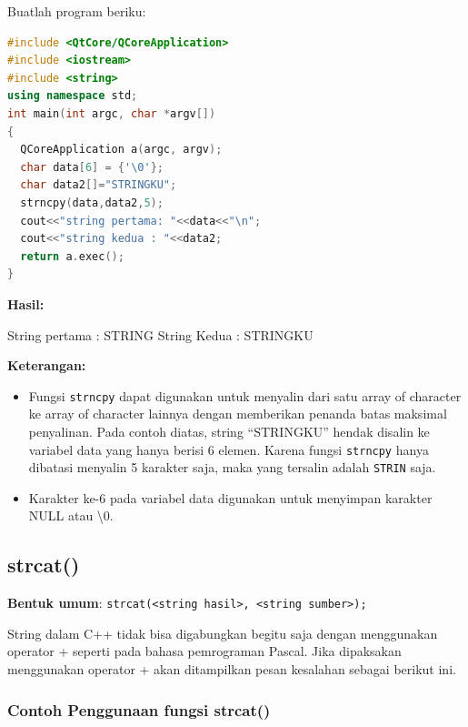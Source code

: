 Buatlah program beriku:

\begin{lstlisting}[language=c++, caption=Penggunaan fungsi strncpy(), label=contoh3-22]
#include <QtCore/QCoreApplication>
#include <iostream>
#include <string>
using namespace std;
int main(int argc, char *argv[])
{
  QCoreApplication a(argc, argv);
  char data[6] = {'\0'};
  char data2[]="STRINGKU";
  strncpy(data,data2,5);
  cout<<"string pertama: "<<data<<"\n";
  cout<<"string kedua : "<<data2;
  return a.exec();
}
\end{lstlisting}

\textbf{Hasil:}
\begin{lcverbatim}
 String pertama : STRING
 String Kedua : STRINGKU
\end{lcverbatim}


\textbf{Keterangan:}

\begin{itemize}

\item
  Fungsi \texttt{strncpy} dapat digunakan untuk menyalin dari satu array
  of character ke array of character lainnya dengan memberikan penanda
  batas maksimal penyalinan. Pada contoh diatas, string ``STRINGKU''
  hendak disalin ke variabel data yang hanya berisi 6 elemen. Karena
  fungsi \texttt{strncpy} hanya dibatasi menyalin 5 karakter saja, maka
  yang tersalin adalah \texttt{STRIN} saja.
\item
  Karakter ke-6 pada variabel data digunakan untuk menyimpan karakter
 NULL atau \textbackslash0.
\end{itemize}

\subsection{strcat()}\label{strcat}

\textbf{Bentuk umum}:
\texttt{strcat(\textless{}string\ hasil\textgreater{},\ \textless{}string\ sumber\textgreater{});}

String dalam C++ tidak bisa digabungkan begitu saja dengan menggunakan
operator + seperti pada bahasa pemrograman Pascal. Jika dipaksakan
menggunakan operator + akan ditampilkan pesan kesalahan sebagai berikut
ini.

\subsubsection*{Contoh  Penggunaan fungsi strcat()}

